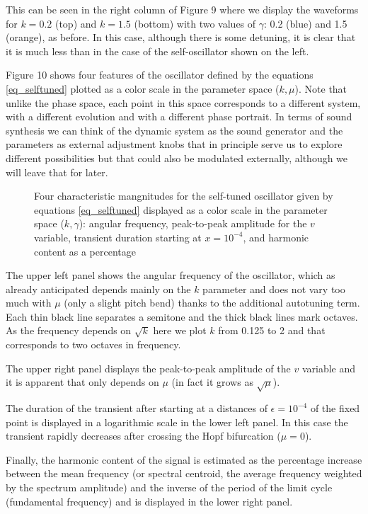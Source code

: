 \documentclass{article}
\begin{document}
This can be seen in the right column of Figure 9 where we display the waveforms for $k=0.2$ (top) and $k=1.5$ (bottom) with two values of $\gamma$: 0.2 (blue) and 1.5 (orange), as before. 
In this case, although there is some detuning, it is clear that it is much less than in the case of the self-oscillator shown on the left.

Figure 10 shows four features of the oscillator defined by the equations \ref{eq_selftuned} plotted as a color scale in the parameter space ($k,\mu$). 
Note that unlike the phase space, each point in this space corresponds to a different system, with a different evolution and with a different phase portrait. 
In terms of sound synthesis we can think of the dynamic system as the sound generator and the parameters as external adjustment knobs that in principle serve us to explore different possibilities but that could also be modulated externally, although we will leave that for later.

\begin{figure}
    \centering
    \caption{Four characteristic mangnitudes for the self-tuned oscillator given by equations \ref{eq_selftuned} displayed as a color scale in the parameter space ($k,\gamma$): angular frequency, peak-to-peak amplitude for the $v$ variable, transient duration starting at $x=10^{-4}$, and harmonic content as a percentage} 
    \label{fig_selfcompared}
\end{figure}

The upper left panel shows the angular frequency of the oscillator, which as already anticipated depends mainly on the $k$ parameter and does not vary too much with $\mu$ (only a slight pitch bend) thanks to the additional autotuning term. 
Each thin black line separates a semitone and the thick black lines mark octaves. 
As the frequency depends on $\sqrt{k}$ here we plot $k$ from 0.125 to 2 and that corresponds to two octaves in frequency.

The upper right panel displays the peak-to-peak amplitude of the $v$ variable and it is apparent that only depends on $\mu$ (in fact it grows as $\sqrt{\mu}$). 

The duration of the transient after starting at a distances of $\epsilon = 10^{-4}$ of the fixed point is displayed in a logarithmic scale in the lower left panel. 
In this case the transient rapidly decreases after crossing the Hopf bifurcation ($\mu=0$). 

Finally, the harmonic content of the signal is estimated as the percentage increase between the mean frequency (or spectral centroid, the average frequency weighted by the spectrum amplitude) and the inverse of the period of the limit cycle (fundamental frequency) and is displayed in the lower right panel.
\end{document}
